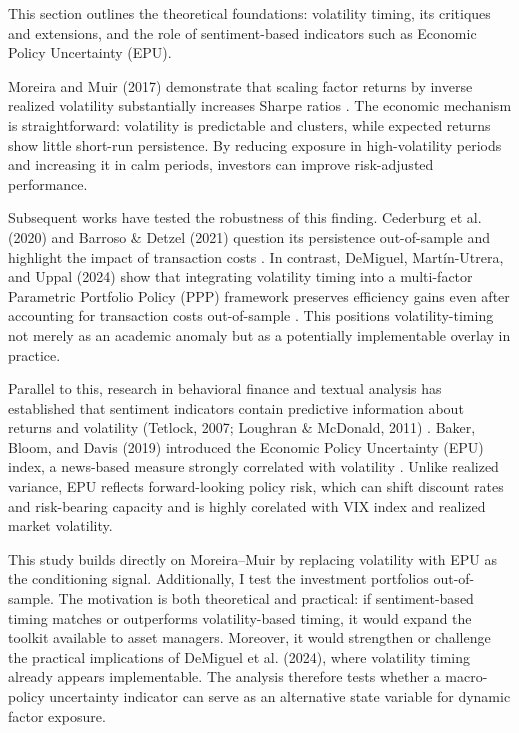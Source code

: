 This section outlines the theoretical foundations: volatility timing, its critiques and extensions, and the role of sentiment-based indicators such as Economic Policy Uncertainty (EPU).

Moreira and Muir (2017) demonstrate that scaling factor returns by inverse realized volatility substantially increases Sharpe ratios \citep{moreira2017}. The economic mechanism is straightforward: volatility is predictable and clusters, while expected returns show little short-run persistence. By reducing exposure in high-volatility periods and increasing it in calm periods, investors can improve risk-adjusted performance.

Subsequent works have tested the robustness of this finding. Cederburg et al. (2020) and Barroso \& Detzel (2021) question its persistence out-of-sample and highlight the impact of transaction costs \citep{cederburg2020, barroso2021}. In contrast, DeMiguel, Martín-Utrera, and Uppal (2024) show that integrating volatility timing into a multi-factor Parametric Portfolio Policy (PPP) framework preserves efficiency gains even after accounting for transaction costs out-of-sample \citep{demiguel2024}. This positions volatility-timing not merely as an academic anomaly but as a potentially implementable overlay in practice.

Parallel to this, research in behavioral finance and textual analysis has established that sentiment indicators contain predictive information about returns and volatility (Tetlock, 2007; Loughran \& McDonald, 2011) \citep{tetlock2007, loughran2011}. Baker, Bloom, and Davis (2019) introduced the Economic Policy Uncertainty (EPU) index, a news-based measure strongly correlated with volatility \citep{baker2019}. Unlike realized variance, EPU reflects forward-looking policy risk, which can shift discount rates and risk-bearing capacity and is highly corelated with VIX index and realized market volatility.

This study builds directly on Moreira–Muir by replacing volatility with EPU as the conditioning signal. Additionally, I test the investment portfolios out-of-sample. The motivation is both theoretical and practical: if sentiment-based timing matches or outperforms volatility-based timing, it would expand the toolkit available to asset managers. Moreover, it would strengthen or challenge the practical implications of DeMiguel et al. (2024), where volatility timing already appears implementable. The analysis therefore tests whether a macro-policy uncertainty indicator can serve as an alternative state variable for dynamic factor exposure.

